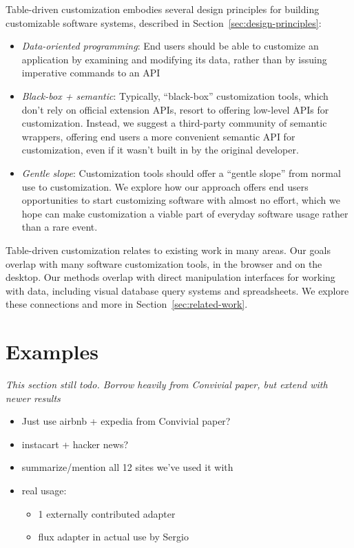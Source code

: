 \documentclass[sigplan,10pt,anonymous,review]{acmart}
\providecommand{\tightlist}{%
  \setlength{\itemsep}{0pt}\setlength{\parskip}{0pt}}
\begin{document}
Table-driven customization embodies several design principles for
building customizable software systems, described in
Section~\ref{sec:design-principles}:

\begin{itemize}
\tightlist
\item
  \emph{Data-oriented programming}: End users should be able to
  customize an application by examining and modifying its data, rather
  than by issuing imperative commands to an API
\item
  \emph{Black-box + semantic}: Typically, ``black-box'' customization
  tools, which don't rely on official extension APIs, resort to offering
  low-level APIs for customization. Instead, we suggest a third-party
  community of semantic wrappers, offering end users a more convenient
  semantic API for customization, even if it wasn't built in by the
  original developer.
\item
  \emph{Gentle slope}: Customization tools should offer a ``gentle
  slope'' from normal use to customization. We explore how our approach
  offers end users opportunities to start customizing software with
  almost no effort, which we hope can make customization a viable part
  of everyday software usage rather than a rare event.
\end{itemize}

Table-driven customization relates to existing work in many areas. Our
goals overlap with many software customization tools, in the browser and
on the desktop. Our methods overlap with direct manipulation interfaces
for working with data, including visual database query systems and
spreadsheets. We explore these connections and more in
Section~\ref{sec:related-work}.

\hypertarget{sec:examples}{%
\section{Examples}\label{sec:examples}}

\emph{This section still todo. Borrow heavily from Convivial paper, but
extend with newer results}

\begin{itemize}
\tightlist
\item
  Just use airbnb + expedia from Convivial paper?
\item
  instacart + hacker news?
\item
  summarize/mention all 12 sites we've used it with
\item
  real usage:

  \begin{itemize}
  \tightlist
  \item
    1 externally contributed adapter
  \item
    flux adapter in actual use by Sergio
  \end{itemize}
\end{itemize}
\end{document}
